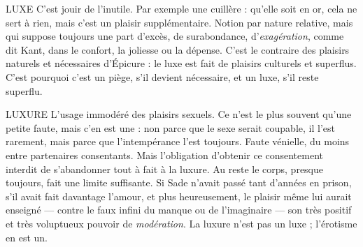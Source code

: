 {LUXE C'est jouir de l’inutile. Par exemple une cuillère : qu’elle soit en or,
cela ne sert à rien, mais c’est un plaisir supplémentaire. Notion par
nature relative, mais qui suppose toujours une part d’excès, de surabondance,
d’{\it exagération}, comme dit Kant, dans le confort, la joliesse ou la dépense. C’est
le contraire des plaisirs naturels et nécessaires d’Épicure : le luxe est fait de plaisirs
culturels et superflus. C’est pourquoi c’est un piège, s’il devient nécessaire,
et un luxe, s’il reste superflu.

LUXURE L'usage immodéré des plaisirs sexuels. Ce n’est le plus souvent
qu’une petite faute, mais c’en est une : non parce que le sexe serait
coupable, il l’est rarement, mais parce que l’intempérance l’est toujours. Faute
vénielle, du moins entre partenaires consentants. Mais l’obligation d’obtenir ce
consentement interdit de s’abandonner tout à fait à la luxure. Au reste le corps,
presque toujours, fait une limite suffisante. Si Sade n’avait passé tant d’années
en prison, s’il avait fait davantage l'amour, et plus heureusement, le plaisir
même lui aurait enseigné — contre le faux infini du manque ou de l’imaginaire
— son très positif et très voluptueux pouvoir de {\it modération}. La luxure n’est pas
un luxe ; l'érotisme en est un.

}
